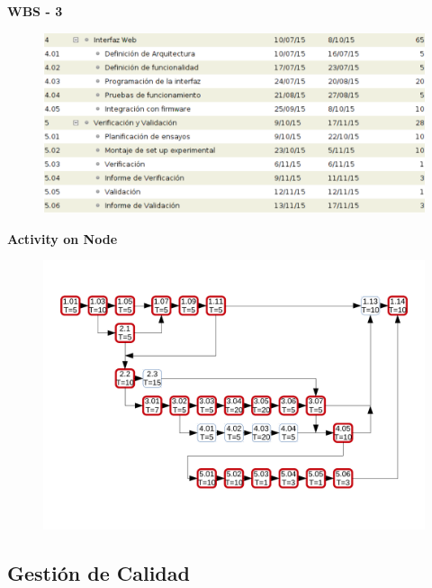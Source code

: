 \documentclass{beamer}
\begin{document}
\begin{frame}{\textbf{WBS - 3}}
\fontsize{14pt}{15}\selectfont
\begin{figure}[H]
	  	{\includegraphics[width=1\textwidth]{./imagenes/wbs3.png}}
	\end{figure}	
\end{frame}



\begin{frame}{\textbf{Activity on Node}}
\fontsize{14pt}{15}\selectfont
	\begin{figure}[H]
	  	\includegraphics[width=1\textwidth]{./imagenes/AoN.pdf}
	\end{figure}	  
\end{frame}

\subsection[Calidad]{Gestión de Calidad}
\end{document}
